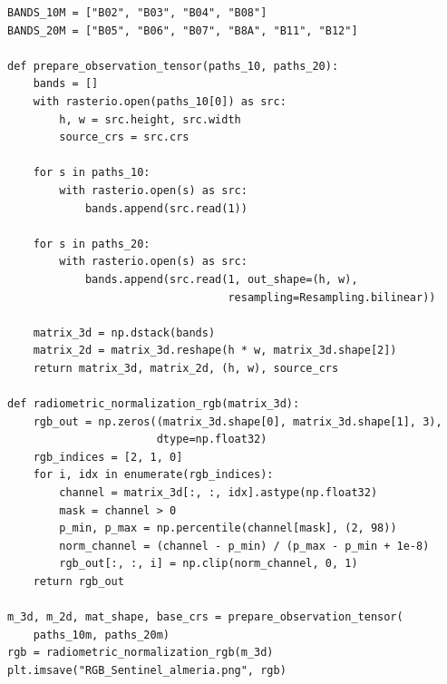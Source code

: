 \documentclass[12pt,a4paper]{article}
\begin{document}
\begin{lstlisting}[caption={Loading Sentinel-2 bands and preparing the RGB image.},label={lst:data-rgb}]
BANDS_10M = ["B02", "B03", "B04", "B08"]
BANDS_20M = ["B05", "B06", "B07", "B8A", "B11", "B12"]

def prepare_observation_tensor(paths_10, paths_20):
    bands = []
    with rasterio.open(paths_10[0]) as src:
        h, w = src.height, src.width
        source_crs = src.crs

    for s in paths_10:
        with rasterio.open(s) as src:
            bands.append(src.read(1))

    for s in paths_20:
        with rasterio.open(s) as src:
            bands.append(src.read(1, out_shape=(h, w),
                                  resampling=Resampling.bilinear))

    matrix_3d = np.dstack(bands)
    matrix_2d = matrix_3d.reshape(h * w, matrix_3d.shape[2])
    return matrix_3d, matrix_2d, (h, w), source_crs

def radiometric_normalization_rgb(matrix_3d):
    rgb_out = np.zeros((matrix_3d.shape[0], matrix_3d.shape[1], 3),
                       dtype=np.float32)
    rgb_indices = [2, 1, 0]
    for i, idx in enumerate(rgb_indices):
        channel = matrix_3d[:, :, idx].astype(np.float32)
        mask = channel > 0
        p_min, p_max = np.percentile(channel[mask], (2, 98))
        norm_channel = (channel - p_min) / (p_max - p_min + 1e-8)
        rgb_out[:, :, i] = np.clip(norm_channel, 0, 1)
    return rgb_out

m_3d, m_2d, mat_shape, base_crs = prepare_observation_tensor(
    paths_10m, paths_20m)
rgb = radiometric_normalization_rgb(m_3d)
plt.imsave("RGB_Sentinel_almeria.png", rgb)
\end{lstlisting}
\end{document}
